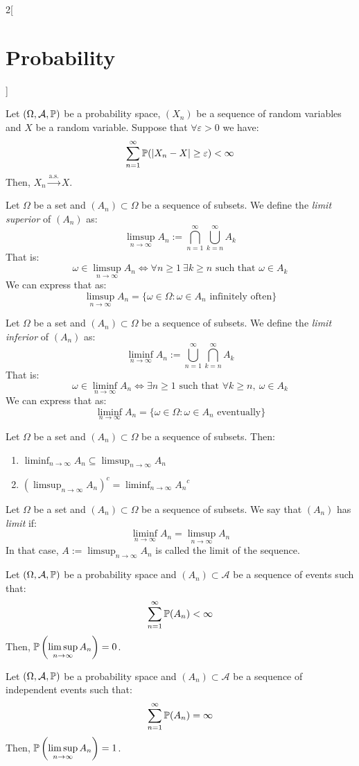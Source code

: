 \documentclass[../../../main_math.tex]{subfiles}
\begin{document}
\begin{multicols}{2}[\section{Probability}]
\begin{proposition}
  \end{proposition}
  \begin{proposition}
    Let $(\Omega,\mathcal{A},\mathbb{P})$ be a probability space, $(X_n)$ be a sequence of random variables and $X$ be a random variable. Suppose that $\forall\varepsilon >0$ we have: $$\sum_{n=1}^\infty\mathbb{P}(|X_n-X|\geq\varepsilon)<\infty$$
    Then, $X_n\overset{\text{a.s.}}{\longrightarrow} X$.
  \end{proposition}
  \begin{definition}
    Let $\Omega$ be a set and $(A_n)\subset\Omega$ be a sequence of subsets. We define the \emph{limit superior} of $(A_n)$ as: $$\limsup_{n\to\infty}A_n:=\bigcap_{n=1}^\infty\bigcup_{k=n}^\infty A_k$$
    That is: $$\omega\in\limsup_{n\to\infty}A_n\iff\forall n\geq 1\ \exists k\geq n\text{ such that }\omega\in A_k$$ We can express that as:
    $$\limsup_{n\to\infty}A_n=\{\omega\in\Omega:\omega\in A_n\text{ infinitely often}\}$$
  \end{definition}
  \begin{definition}
    Let $\Omega$ be a set and $(A_n)\subset\Omega$ be a sequence of subsets. We define the \emph{limit inferior} of $(A_n)$ as: $$\liminf_{n\to\infty}A_n:=\bigcup_{n=1}^\infty\bigcap_{k=n}^\infty A_k$$
    That is: $$\omega\in\liminf_{n\to\infty}A_n\iff\exists n\geq 1\text{ such that }\forall k\geq n,\ \omega\in A_k$$ We can express that as:
    $$\liminf_{n\to\infty}A_n=\{\omega\in\Omega:\omega\in A_n\text{ eventually}\}$$
  \end{definition}
  \begin{proposition}
    Let $\Omega$ be a set and $(A_n)\subset\Omega$ be a sequence of subsets. Then:
    \begin{enumerate}
      \item $\displaystyle\liminf_{n\to\infty}A_n\subseteq\limsup_{n\to\infty}A_n$
      \item $\displaystyle{\left(\limsup_{n\to\infty}A_n\right)}^c=\liminf_{n\to\infty}{A_n}^c$
    \end{enumerate}
  \end{proposition}
  \begin{definition}
    Let $\Omega$ be a set and $(A_n)\subset\Omega$ be a sequence of subsets. We say that $(A_n)$ has \emph{limit} if: $$\liminf_{n\to\infty}A_n=\limsup_{n\to\infty}A_n$$
    In that case, $\displaystyle A:=\limsup_{n\to\infty}A_n$ is called the limit of the sequence.
  \end{definition}
  \begin{lemma}
    Let $(\Omega,\mathcal{A},\mathbb{P})$ be a probability space and $(A_n)\subset\mathcal{A}$ be a sequence of events such that: $$\sum_{n=1}^\infty\mathbb{P}(A_n)<\infty$$
    Then, $\displaystyle\mathbb{P}\left(\limsup_{n\to\infty} A_n\right)=0$.
  \end{lemma}
  \begin{lemma}
    Let $(\Omega,\mathcal{A},\mathbb{P})$ be a probability space and $(A_n)\subset\mathcal{A}$ be a sequence of independent events such that: $$\sum_{n=1}^\infty\mathbb{P}(A_n)=\infty$$
    Then, $\displaystyle\mathbb{P}\left(\limsup_{n\to\infty} A_n\right)=1$.
  \end{lemma}

\end{multicols}
\end{document}
